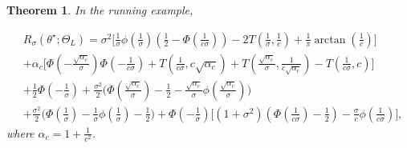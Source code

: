 \documentclass[11pt]{article}
\theoremstyle{plain}
\newtheorem{theorem}{Theorem}[section]
\theoremstyle{definition}
\begin{document}
\begin{theorem}\label{thm:hatthetaLExactRisk}
    In the running example,
    
\begin{align*}
&R_\sigma(\theta^\star; \Theta_L)
=
\sigma^2\Bigg[
\frac{1}{\sigma}\phi\left(\frac{1}{\sigma}\right)
\left(\frac12-\Phi\left(\frac{1}{c\sigma}\right)\right)
-2T\left(\frac{1}{\sigma},\frac{1}{c}\right)
+\frac{1}{\pi}\arctan \left ( \frac{1}{c} \right)
\Bigg] \\
&
+\alpha_c\Bigg[
\Phi\left(-\frac{\sqrt{\alpha_c}}{\sigma}\right)
\Phi\left(-\frac{1}{c\sigma}\right)
+T\left(\frac{1}{c\sigma},c\sqrt{\alpha_c}\right)
+T\left(\frac{\sqrt{\alpha_c}}{\sigma},\frac{1}{c\sqrt{\alpha_c}}\right)
-T\left(\frac{1}{c\sigma},c\right)
\Bigg] \\
&
+\frac12\Phi\left(-\frac{1}{\sigma}\right) 
+\frac{\sigma^2}{2}\Bigg(
\Phi\left(\frac{\sqrt{\alpha_c}}{\sigma}\right)
-\frac12
-\frac{\sqrt{\alpha_c}}{\sigma}
\phi\left(\frac{\sqrt{\alpha_c}}{\sigma}\right)
\Bigg) \\
&
+\frac{\sigma^2}{2}\Bigg(
\Phi\left(\frac{1}{\sigma}\right)
-\frac{1}{\sigma}\phi\left(\frac{1}{\sigma}\right)
-\frac12
\Bigg) 
+\Phi\left(-\frac{1}{\sigma}\right)
\Bigg[
(1+\sigma^2)
\left(
\Phi\left(\frac{1}{c\sigma}\right)-\frac12
\right)
-\frac{\sigma}{c}\phi\left(\frac{1}{c\sigma}\right)
\Bigg],
\end{align*}
    where $\alpha_c = 1+\frac{1}{c^2}$.
\end{theorem}
\end{document}
